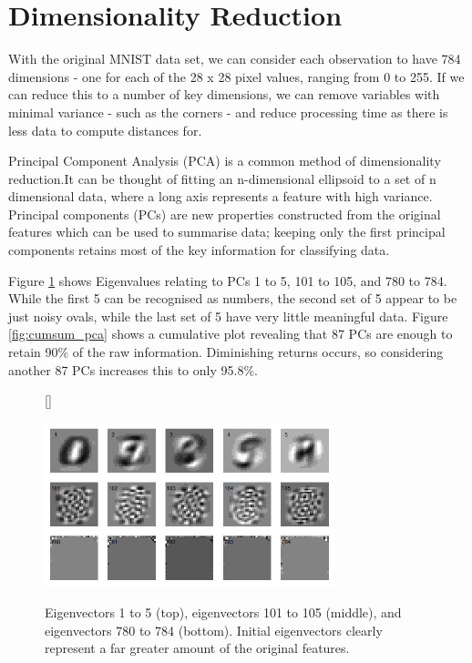 \documentclass[11pt]{article} %
\begin{document}
\section{Dimensionality Reduction}

With the original MNIST data set, we can consider each observation to have 784 dimensions - one for each of the 28 x 28 pixel values, ranging from 0 to 255. If we can reduce this to a number of key dimensions, we can remove variables with minimal variance - such as the corners - and reduce processing time as there is less data to compute distances for.

Principal Component Analysis (PCA) is a common method of dimensionality reduction.It can be thought of fitting an n-dimensional ellipsoid to a set of n dimensional data, where a long axis represents a feature with high variance. Principal components (PCs) are new properties constructed from the original features which can be used to summarise data; keeping only the first principal components retains most of the key information for classifying data. 

 Figure \ref{fig:pca_rotations_range} shows Eigenvalues relating to PCs 1 to 5, 101 to 105, and 780 to 784. While the first 5 can be recognised as numbers, the second set of 5 appear to be just noisy ovals, while the last set of 5 have very little meaningful data.  Figure \ref{fig:cumsum_pca} shows a cumulative plot revealing that 87 PCs are enough to retain 90\% of the raw information. Diminishing returns occurs, so considering another 87 PCs increases this to only 95.8\%. 


\begin{figure}[htb!]
[\FBwidth]
{\caption{Eigenvectors 1 to 5 (top), eigenvectors 101 to 105 (middle), and eigenvectors 780 to 784 (bottom). Initial eigenvectors clearly represent a far greater amount of the original features.}\label{fig:pca_rotations_range}}
{\includegraphics[width=0.75\textwidth]{pca_rotations_wider_range.png}}
\end{figure}
\end{document}
